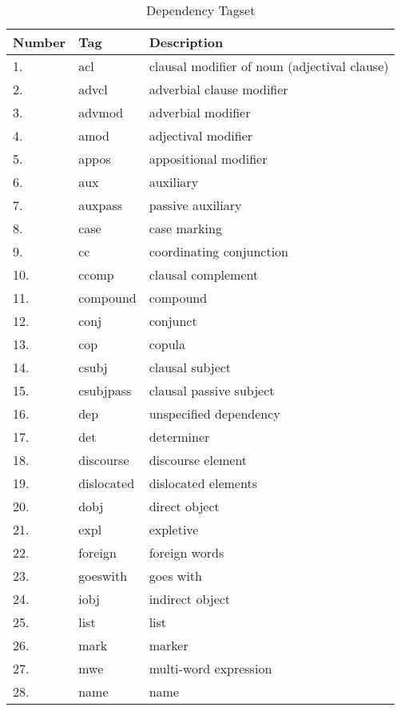 \begin{table}[h]
	\centering
	      \caption{Dependency Tagset}
     \label{table:AllDependencyTags}
    \begin{tabular}{| l | l | l |}
    \hline
    Number & Tag & Description \\ \hline
	\hline
1. & 	acl  & clausal modifier of noun (adjectival clause) \\ \hline
2. &    advcl  & adverbial clause modifier\\ \hline
3. & 	advmod  & adverbial modifier \\ \hline
4. &    amod  & adjectival modifier \\ \hline
5. & 	appos  & appositional modifier \\ \hline
6. & 	aux  & auxiliary \\ \hline
7. &    auxpass  & passive auxiliary \\ \hline
8. & 	case  & case marking \\ \hline
9. & 	cc  & coordinating conjunction \\ \hline
10. &  ccomp  & clausal complement \\ \hline
11. &  compound  & compound \\ \hline
12. & 	conj  & conjunct \\ \hline
13. & 	cop  & copula \\ \hline
14. &  csubj  & clausal subject \\ \hline
15. &  csubjpass  & clausal passive subject \\ \hline
16. &  dep  & unspecified dependency \\ \hline
17. & det  & determiner \\ \hline
18. & discourse  & discourse element \\ \hline
19. &  dislocated  & dislocated elements \\ \hline
20. & 	dobj  & direct object \\ \hline
21. &  expl  & expletive \\ \hline
22. &  foreign  & foreign words \\ \hline
23. &  goeswith  & goes with \\ \hline
24. &  iobj  & indirect object \\ \hline
25. &  list  & list \\ \hline
26. &  mark  & marker \\ \hline
27. &  mwe  & multi-word expression \\ \hline
28. &  name  & name \\ \hline

\end{tabular}
\end{table}
